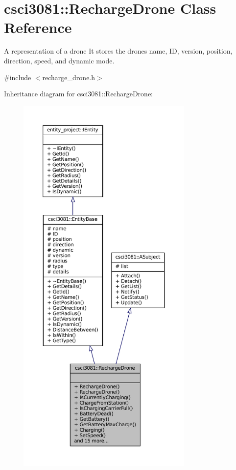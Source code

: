 \hypertarget{classcsci3081_1_1RechargeDrone}{}\section{csci3081\+:\+:Recharge\+Drone Class Reference}
\label{classcsci3081_1_1RechargeDrone}


A representation of a drone It stores the drone\textquotesingle{}s name, ID, version, position, direction, speed, and dynamic mode.  




{\ttfamily \#include $<$recharge\+\_\+drone.\+h$>$}



Inheritance diagram for csci3081\+:\+:Recharge\+Drone\+:
\nopagebreak
\begin{figure}[H]
\begin{center}
\leavevmode
\includegraphics[height=550pt]{classcsci3081_1_1RechargeDrone__inherit__graph}
\end{center}
\end{figure}
